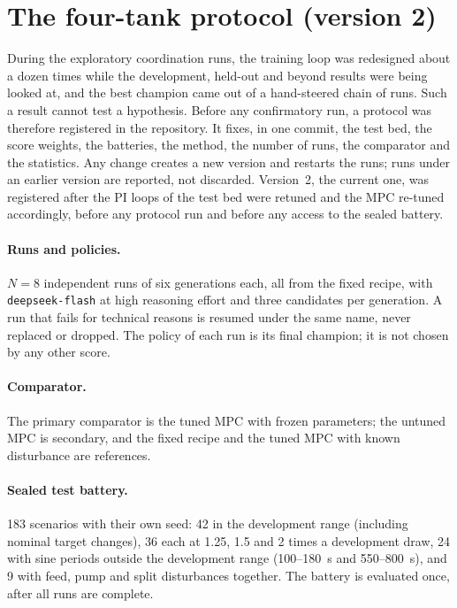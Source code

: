 \section{The four-tank protocol (version 2)}
\label{app:four-tank-protocol}
During the exploratory coordination runs, the training loop was redesigned
about a dozen times while the development, held-out and beyond results were
being looked at, and the best champion came out of a hand-steered chain of
runs. Such a result cannot test a hypothesis. Before any confirmatory run,
a protocol was therefore registered in the repository. It fixes, in one
commit, the test bed, the score weights, the batteries, the method, the
number of runs, the comparator and the statistics. Any change creates a new
version and restarts the runs; runs under an earlier version are reported,
not discarded. Version~2, the current one, was registered after the PI loops
of the test bed were retuned and the MPC re-tuned accordingly, before any
protocol run and before any access to the sealed battery.

\paragraph{Runs and policies.} $N = 8$ independent runs of six generations
each, all from the fixed recipe, with \texttt{deepseek-flash} at high
reasoning effort and three candidates per generation. A run that fails for
technical reasons is resumed under the same name, never replaced or dropped.
The policy of each run is its final champion; it is not chosen by any other
score.

\paragraph{Comparator.} The primary comparator is the tuned MPC with frozen
parameters; the untuned MPC is secondary, and the fixed recipe and the tuned
MPC with known disturbance are references.

\paragraph{Sealed test battery.} 183 scenarios with their own seed: 42 in the
development range (including nominal target changes), 36 each at 1.25, 1.5
and 2 times a development draw, 24 with sine periods outside the development
range (100--180~s and 550--800~s), and 9 with feed, pump and split
disturbances together. The battery is evaluated once, after all runs are
complete.

